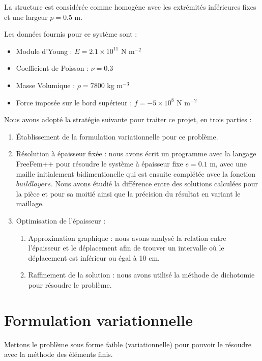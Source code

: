 \documentclass{article}
\begin{document}
    La structure est considérée comme homogène avec les extrémités inférieures fixes et une largeur $p = 0.5$ m. 
    
    Les données fournis pour ce système sont :
    
    \begin{itemize}
    \item Module d'Young : $E = 2.1 \times 10^11$ N m$^{-2}$
    \item Coefficient de Poisson : $\nu = 0.3$ 
    \item Masse Volumique : $\rho = 7800$ kg m$^{-3}$
    \item Force imposée sur le bord supérieur : $f= - 5 \times 10^8$ N m$^{-2}$
    \end{itemize}
    
    Nous avons adopté la stratégie suivante pour traiter ce projet, en trois parties :
    \begin{enumerate}
        \item Établissement de la formulation variationnelle pour ce problème.
        \item Résolution à épaisseur fixée : nous avons écrit un programme avec la langage FreeFem++ pour résoudre le système à épaisseur fixe $e = 0.1$ m, 
            avec une maille initialement bidimentionelle qui est ensuite complétée avec la fonction $buildlayers$. 
            Nous avons étudié la différence entre des solutions calculées pour la pièce et pour sa moitié ainsi que la précision du résultat en variant le maillage.
        \item Optimisation de l'épaisseur :
        \begin{enumerate}
            \item Approximation graphique : 
                nous avons analysé la relation entre l'épaisseur et le déplacement afin de trouver un intervalle où le déplacement est inférieur ou égal à 10 cm.
            \item Raffinement de la solution : nous avons utilisé la méthode de dichotomie pour résoudre le problème.
        \end{enumerate}
    \end{enumerate}

    \newpage
    
    \section{Formulation variationnelle}

    \begin{problem}{1}
    Mettons le problème sous forme faible (variationnelle) pour pouvoir le résoudre avec la méthode des éléments finis.
    \end{problem}
      
\end{document}
